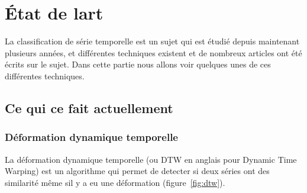 \documentclass[11pt]{sdm}
\begin{document}
 

\section{\'Etat de l\textquotesingle art}
	La classification de s\'erie temporelle est un sujet qui est \'etudi\'e depuis maintenant plusieurs ann\'ees, et diff\'erentes techniques existent et de nombreux articles ont \'et\'e \'ecrits sur le sujet. Dans cette partie nous allons voir quelques unes de ces diff\'erentes techniques.

	\subsection{Ce qui ce fait actuellement}
		\subsubsection{D\'eformation dynamique temporelle}
			La d\'eformation dynamique temporelle (ou DTW en anglais pour Dynamic Time Warping) est un algorithme qui permet de detecter si deux s\'eries ont des similarit\'e m\^eme s\textquotesingle il y a eu une d\'eformation (figure~\ref{fig:dtw}).
\end{document}

